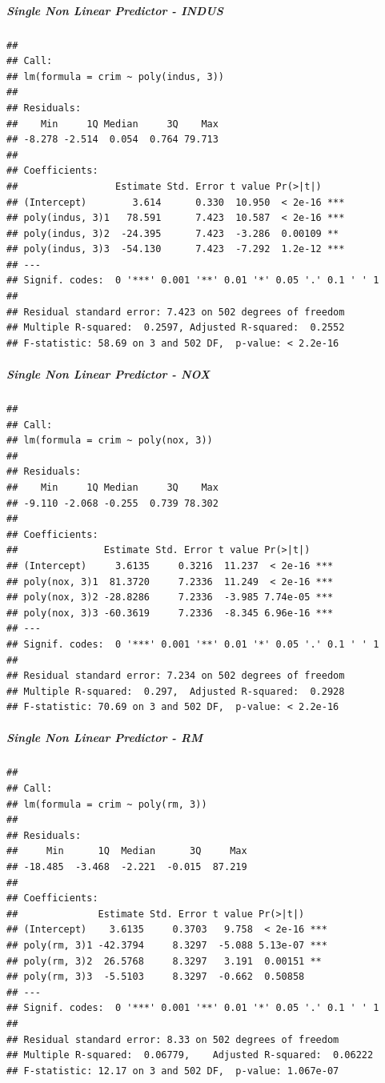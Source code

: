 \documentclass[
]{article}
\begin{document}
\hypertarget{single-non-linear-predictor---indus}{%
\subparagraph{\texorpdfstring{\textbf{Single Non Linear Predictor -
INDUS}}{Single Non Linear Predictor - INDUS}}\label{single-non-linear-predictor---indus}}

\begin{verbatim}
## 
## Call:
## lm(formula = crim ~ poly(indus, 3))
## 
## Residuals:
##    Min     1Q Median     3Q    Max 
## -8.278 -2.514  0.054  0.764 79.713 
## 
## Coefficients:
##                 Estimate Std. Error t value Pr(>|t|)    
## (Intercept)        3.614      0.330  10.950  < 2e-16 ***
## poly(indus, 3)1   78.591      7.423  10.587  < 2e-16 ***
## poly(indus, 3)2  -24.395      7.423  -3.286  0.00109 ** 
## poly(indus, 3)3  -54.130      7.423  -7.292  1.2e-12 ***
## ---
## Signif. codes:  0 '***' 0.001 '**' 0.01 '*' 0.05 '.' 0.1 ' ' 1
## 
## Residual standard error: 7.423 on 502 degrees of freedom
## Multiple R-squared:  0.2597, Adjusted R-squared:  0.2552 
## F-statistic: 58.69 on 3 and 502 DF,  p-value: < 2.2e-16
\end{verbatim}

\hypertarget{single-non-linear-predictor---nox}{%
\subparagraph{\texorpdfstring{\textbf{Single Non Linear Predictor -
NOX}}{Single Non Linear Predictor - NOX}}\label{single-non-linear-predictor---nox}}

\begin{verbatim}
## 
## Call:
## lm(formula = crim ~ poly(nox, 3))
## 
## Residuals:
##    Min     1Q Median     3Q    Max 
## -9.110 -2.068 -0.255  0.739 78.302 
## 
## Coefficients:
##               Estimate Std. Error t value Pr(>|t|)    
## (Intercept)     3.6135     0.3216  11.237  < 2e-16 ***
## poly(nox, 3)1  81.3720     7.2336  11.249  < 2e-16 ***
## poly(nox, 3)2 -28.8286     7.2336  -3.985 7.74e-05 ***
## poly(nox, 3)3 -60.3619     7.2336  -8.345 6.96e-16 ***
## ---
## Signif. codes:  0 '***' 0.001 '**' 0.01 '*' 0.05 '.' 0.1 ' ' 1
## 
## Residual standard error: 7.234 on 502 degrees of freedom
## Multiple R-squared:  0.297,  Adjusted R-squared:  0.2928 
## F-statistic: 70.69 on 3 and 502 DF,  p-value: < 2.2e-16
\end{verbatim}

\hypertarget{single-non-linear-predictor---rm}{%
\subparagraph{\texorpdfstring{\textbf{Single Non Linear Predictor -
RM}}{Single Non Linear Predictor - RM}}\label{single-non-linear-predictor---rm}}

\begin{verbatim}
## 
## Call:
## lm(formula = crim ~ poly(rm, 3))
## 
## Residuals:
##     Min      1Q  Median      3Q     Max 
## -18.485  -3.468  -2.221  -0.015  87.219 
## 
## Coefficients:
##              Estimate Std. Error t value Pr(>|t|)    
## (Intercept)    3.6135     0.3703   9.758  < 2e-16 ***
## poly(rm, 3)1 -42.3794     8.3297  -5.088 5.13e-07 ***
## poly(rm, 3)2  26.5768     8.3297   3.191  0.00151 ** 
## poly(rm, 3)3  -5.5103     8.3297  -0.662  0.50858    
## ---
## Signif. codes:  0 '***' 0.001 '**' 0.01 '*' 0.05 '.' 0.1 ' ' 1
## 
## Residual standard error: 8.33 on 502 degrees of freedom
## Multiple R-squared:  0.06779,    Adjusted R-squared:  0.06222 
## F-statistic: 12.17 on 3 and 502 DF,  p-value: 1.067e-07
\end{verbatim}
\end{document}
